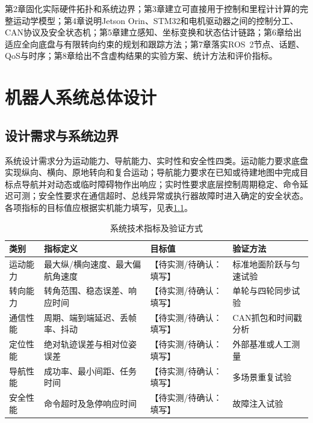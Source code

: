 \documentclass[UTF8,openany,12pt,a4paper]{ctexrep}
\newcommand{\placeholder}[1]{\textcolor{red!70!black}{【待实测/待确认：#1】}}
\begin{document}
第2章固化实际硬件拓扑和系统边界；第3章建立可直接用于控制和里程计计算的完整运动学模型；第4章说明Jetson Orin、STM32和电机驱动器之间的控制分工、CAN协议及安全状态机；第5章建立感知、坐标变换和状态估计链路；第6章给出适应全向底盘与有限转向约束的规划和跟踪方法；第7章落实ROS~2节点、话题、QoS与时序；第8章给出不含虚构结果的实验方案、统计方法和评价指标。

\chapter{机器人系统总体设计}
\section{设计需求与系统边界}
系统设计需求分为运动能力、导航能力、实时性和安全性四类。运动能力要求底盘实现纵向、横向、原地转向和复合运动；导航能力要求在已知或待建地图中完成目标点导航并对动态或临时障碍物作出响应；实时性要求底层控制周期稳定、命令延迟可测；安全性要求在通信超时、总线异常或执行器故障时进入确定的安全状态。各项指标的目标值应根据实机能力填写，见表\ref{tab:req}。

\begin{table}[H]\centering
\caption{系统技术指标及验证方式}\label{tab:req}
\begin{tabular}{p{3.0cm}p{5.0cm}p{3.2cm}p{3.1cm}}
\toprule 类别 & 指标定义 & 目标值 & 验证方法\\ \midrule
运动能力 & 最大纵/横向速度、最大偏航角速度 & \placeholder{填写} & 标准地面阶跃与匀速试验\\
转向能力 & 转角范围、稳态误差、响应时间 & \placeholder{填写} & 单轮与四轮同步试验\\
通信性能 & 周期、端到端延迟、丢帧率、抖动 & \placeholder{填写} & CAN抓包和时间戳分析\\
定位性能 & 绝对轨迹误差与相对位姿误差 & \placeholder{填写} & 外部基准或人工测量\\
导航性能 & 成功率、最小间距、任务时间 & \placeholder{填写} & 多场景重复试验\\
安全性能 & 命令超时及急停响应时间 & \placeholder{填写} & 故障注入试验\\ \bottomrule
\end{tabular}
\end{table}
\end{document}
